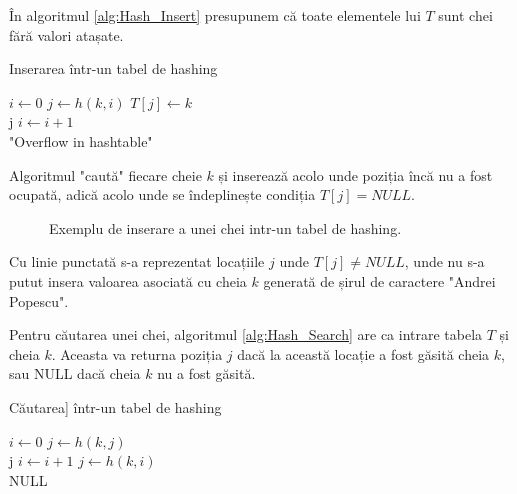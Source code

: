 În algoritmul \ref{alg:Hash_Insert} presupunem că toate elementele lui $T$ sunt chei fără valori atașate.


\begin{algorithm} [H]
	\caption{Inserarea într-un tabel de hashing}\label{alg:Hash_Insert}
	\begin{algorithmic}[1]
		\State $i \gets 0$		
		\State $j \gets h(k,i)$		
		\State $T[j] \gets k$\\
		\tab{}\tab{}\Return j
		\Else
		\State $i \gets i+1$		
		\EndIf
		\EndWhile \\	
		\Return "Overflow in hashtable"
		\EndProcedure
	\end{algorithmic}
\end{algorithm}

Algoritmul "caută" fiecare cheie $k$ și inserează acolo unde poziția încă nu a fost ocupată, adică acolo unde se îndeplinește condiția $T[j]=NULL$.

\begin{figure}[H] 
	\centering	
	{
	}
	\caption{Exemplu de inserare a unei chei intr-un tabel de hashing.} 
	\label{fig:hashinsert}
\end{figure}

Cu linie punctată s-a reprezentat locațiile $j$ unde $T[j] \neq NULL$, unde nu s-a putut insera valoarea asociată cu cheia $k$ generată de șirul de caractere "Andrei Popescu".

Pentru căutarea unei chei, algoritmul \ref{alg:Hash_Search} are ca intrare tabela $T$ și cheia $k$. Aceasta va returna poziția $j$ dacă la această locație a fost găsită cheia $k$, sau NULL dacă cheia $k$ nu a fost găsită.
 

\begin{algorithm} [H]
	\caption{Căutarea] într-un tabel de hashing}\label{alg:Hash_Search}
	\begin{algorithmic}[1]
		\State $i \gets 0$		
		\State $j \gets h(k,j)$	
		\\
		\tab{}\tab{}\Return j
		\EndIf
		\State $i \gets i+1$
		\State $j \gets h(k,i)$			
		\EndWhile\\
		\Return NULL
		\EndProcedure
	\end{algorithmic}
\end{algorithm}

